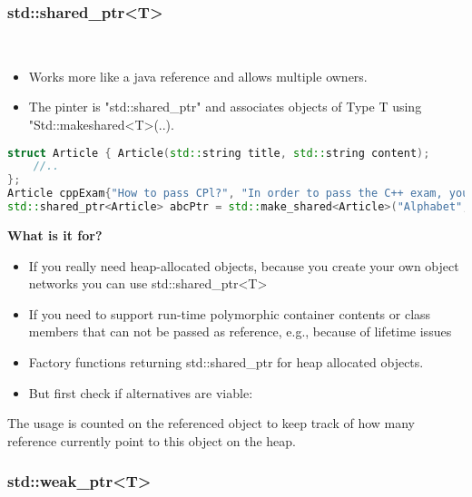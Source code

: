 
\subsubsection{std::shared\_ptr<T>}
\begin{itemize}
  \itemsep -0.5em 
  \item Works more like a java reference and allows multiple owners.
  \item The pinter is "std::shared\_ptr" and associates objects of Type T using "Std::makeshared<T>(..).
\end{itemize}

\begin{lstlisting}[language=C++]
struct Article { Article(std::string title, std::string content);
	//..
};
Article cppExam{"How to pass CPl?", "In order to pass the C++ exam, you have to..."};
std::shared_ptr<Article> abcPtr = std::make_shared<Article>("Alphabet", "ABCDEFGHIJKLMNOPQRSTUVXYZ");
\end{lstlisting}

\textbf{What is it for?}
\begin{itemize}
  \itemsep 0em 
  \item If you really need heap-allocated objects, because you create your own object networks you can use std::shared\_ptr<T> 
  \item  If you need to support run-time polymorphic container contents or class members that can not be passed as reference, e.g., because of lifetime issues 
  \item Factory functions returning std::shared\_ptr for heap allocated objects.
  \item  But first check if alternatives are viable:
\end{itemize}

The usage is counted on the referenced object to keep track of how many reference currently point to this object on the heap.

\subsubsection{std::weak\_ptr<T>}






